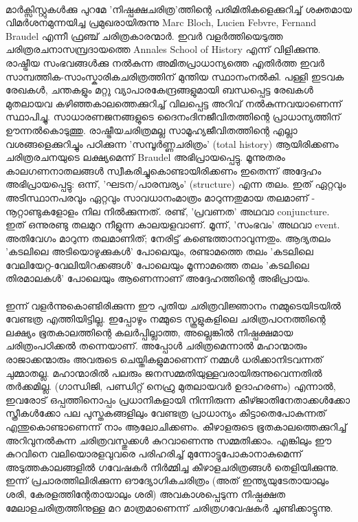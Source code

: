\label{ch1box3} %
\begin{tcolorbox}[%
  breakable, %
  arc=0mm, 
  left=1pt, right = 1pt, 
  boxrule=0mm,
  colback = {blue!10}, %
] 
{\paragraph{}മാർക്സിസ്റ്റുകൾക്കു പുറമേ 'നിഷ്പക്ഷചരിത്ര'ത്തിന്റെ പരിമിതികളെക്കുറിച്ച് ശക്തമായ വിമർശനമുന്നയിച്ച പ്രമുഖരായിരുന്നു Marc Bloch, Lucien Febvre, Fernand Braudel എന്നീ ഫ്രഞ്ച് ചരിത്രകാരന്മാർ. ഇവർ വളർത്തിയെടുത്ത ചരിത്രരചനാസമ്പ്രദായത്തെ Annales School of History എന്ന് വിളിക്കുന്നു. രാഷ്ട്രീയ സംഭവങ്ങൾക്കു നൽകുന്ന അമിതപ്രാധാന്യത്തെ എതിർത്ത ഇവർ സാമ്പത്തിക-സാംസ്കാരികചരിത്രത്തിന് മുന്തിയ സ്ഥാനംനൽകി. പള്ളി ഇടവക രേഖകൾ, ചന്തകളും മറ്റു വ്യാപാരകേന്ദ്രങ്ങളുമായി ബന്ധപ്പെട്ട രേഖകൾ മുതലായവ കഴിഞ്ഞകാലത്തെക്കുറിച്ച് വിലപ്പെട്ട അറിവ് നൽകുന്നവയാണെന്ന് സ്ഥാപിച്ചു. സാധാരണജനങ്ങളുടെ ദൈനംദിനജീവിതത്തിന്റെ പ്രാധാന്യത്തിന് ഊന്നൽകൊടുത്തു. രാഷ്ട്രീയചരിത്രമല്ല സാമൂഹ്യജീവിതത്തിന്റെ എല്ലാ വശങ്ങളെക്കുറിച്ചും പഠിക്കുന്ന 'സമ്പൂർണ്ണചരിത്രം' (total history) ആയിരിക്കണം ചരിത്രരചനയുടെ ലക്ഷ്യമെന്ന് Braudel അഭിപ്രായപ്പെട്ടു. മൂന്നുതരം കാലഗണനാതലങ്ങൾ സ്വീകരിച്ചുകൊണ്ടായിരിക്കണം ഇതെന്ന് അദ്ദേഹം അഭിപ്രായപ്പെട്ടു: ഒന്ന്, 'ഘടന/പാരമ്പര്യം' (structure) എന്ന തലം. ഇത് ഏറ്റവും അടിസ്ഥാനപരവും ഏറ്റവും സാവധാനംമാത്രം മാറുന്നതുമായ തലമാണ് - നൂറ്റാണ്ടുകളോളം നില നിൽക്കുന്നത്. രണ്ട്, 'പ്രവണത' അഥവാ conjuncture. ഇത് ഒന്നുരണ്ടു തലമുറ നീളുന്ന കാലയളവാണ്. മൂന്ന്, 'സംഭവം' അഥവാ event. അതിവേഗം മാറുന്ന തലമാണിത്; നേരിട്ട് കണ്ടെത്താനാവുന്നതും. ആദ്യതലം 'കടലിലെ അടിയൊഴുക്കുകൾ' പോലെയും, രണ്ടാമത്തെ തലം 'കടലിലെ വേലിയേറ്റ-വേലിയിറക്കങ്ങൾ' പോലെയും മൂന്നാമത്തെ തലം 'കടലിലെ തിരമാലകൾ' പോലെയും ആണെന്നാണ് അദ്ദേഹത്തിന്റെ അഭിപ്രായം.}
\end{tcolorbox}




\paragraph{}	ഇന്ന് വളർന്നുകൊണ്ടിരിക്കുന്ന ഈ പുതിയ ചരിത്രവിജ്ഞാനം നമ്മുടെയിടയിൽ വേണ്ടത്ര എത്തിയിട്ടില്ല. ഇപ്പോഴും നമ്മുടെ സ്കൂളുകളിലെ ചരിത്രപഠനത്തിന്റെ ലക്ഷ്യം ഭൂതകാലത്തിന്റെ കലർപ്പില്ലാത്ത, അല്ലെങ്കിൽ നിഷ്പക്ഷമായ ചരിത്രംപഠിക്കൽ തന്നെയാണ്. അപ്പോൾ ചരിത്രമെന്നാൽ മഹാന്മാരും രാജാക്കന്മാരും അവരുടെ ചെയ്തികളുമാണെന്ന് നമ്മൾ ധരിക്കാനിടവന്നത് ചുമ്മാതല്ല. മഹാന്മാരിൽ പലരും ജനസമ്മതിയുള്ളവരായിരുന്നുവെന്നതിൽ തർക്കമില്ല. (ഗാന്ധിജി, പണ്ഡിറ്റ് നെഹ്രു മുതലായവർ ഉദാഹരണം) എന്നാൽ, ഇവരോട് ഒപ്പത്തിനൊപ്പം പ്രധാനികളായി നിന്നിരുന്ന കീഴ്ജാതിനേതാക്കൾക്കോ സ്ത്രീകൾക്കോ പല പുസ്തകങ്ങളിലും വേണ്ടത്ര പ്രാധാന്യം കിട്ടാതെപോകുന്നത് എന്തുകൊണ്ടാണെന്ന് നാം ആലോചിക്കണം. കീഴാളരുടെ ഭൂതകാലത്തെക്കുറിച്ച് അറിവുനൽകുന്ന ചരിത്രവസ്തുക്കൾ കുറവാണെന്നു സമ്മതിക്കാം. എങ്കിലും ഈ കുറവിനെ വലിയൊരളവുവരെ പരിഹരിച്ച് മുന്നോട്ടുപോകാനാകുമെന്ന് അടുത്തകാലങ്ങളിൽ ഗവേഷകർ നിർമ്മിച്ച കീഴാളചരിത്രങ്ങൾ തെളിയിക്കുന്നു. ഇന്ന് പ്രചാരത്തിലിരിക്കുന്ന ഔദ്യോഗികചരിത്രം (അത് ഇന്ത്യയുടേതായാലും ശരി, കേരളത്തിന്റേതായാലും ശരി) അവകാശപ്പെടുന്ന നിഷ്പക്ഷത മേലാളചരിത്രത്തിനുള്ള മറ മാത്രമാണെന്ന് ചരിത്രഗവേഷകർ ചൂണ്ടിക്കാട്ടുന്നു.

